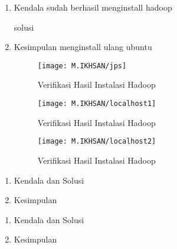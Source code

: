 
\begin{enumerate}
\item Kendala
\newline 
sudah berhasil menginstall hadoop

solusi
\item Kesimpulan
\newline
menginstall ulang ubuntu

\begin{figure}[!ht]
\texttt{[image: M.IKHSAN/jps]}
\caption{Verifikasi Hasil Instalasi Hadoop}
\label{gam:Java-version(M.IKHSAN)}
\end{figure} 

\begin{figure}[!ht]
\texttt{[image: M.IKHSAN/localhost1]}
\caption{Verifikasi Hasil Instalasi Hadoop}
\label{gam:Java-version(M.IKHSAN)}
\end{figure} 

\begin{figure}[!ht]
\texttt{[image: M.IKHSAN/localhost2]}
\caption{Verifikasi Hasil Instalasi Hadoop}
\label{gam:Hadoop-version(M.IKHSAN)}
\end{figure}
\end{enumerate}


\begin{enumerate}
\item Kendala dan Solusi

\item Kesimpulan

\end{enumerate}

\begin{enumerate}
\item Kendala dan Solusi

\item Kesimpulan

\end{enumerate}


